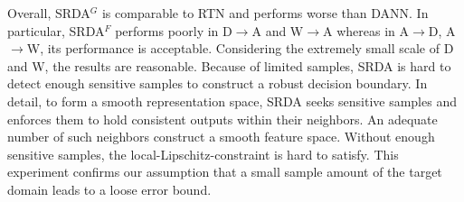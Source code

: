 \documentclass[journal,twocolumn]{IEEEtran}
\theoremstyle{definition}
\begin{document}
Overall, SRDA$^G$ is comparable to RTN and performs worse than DANN. In particular, SRDA$^F$ performs poorly in D$\rightarrow$A and W$\rightarrow$A whereas in A$\rightarrow$D, A$\rightarrow$W, its performance is acceptable. Considering the extremely small scale of D and W, the results are reasonable. Because of limited samples, SRDA is hard to detect enough sensitive samples to construct a robust decision boundary. In detail, to form a smooth representation space, SRDA seeks sensitive samples and enforces them to hold consistent outputs within their neighbors. An adequate number of such neighbors construct a smooth feature space. Without enough sensitive samples, the local-Lipschitz-constraint is hard to satisfy. This experiment confirms our assumption that a small sample amount of the target domain leads to a loose error bound.

\begin{table}[htbp]
\centering
\caption{Classification accuracy percentage of Office-31 classification experiment among all four tasks. The first row corresponds to the performance if no adaption is implemented. We evaluate two SRDA models with different methods for adding noise. The results are cited from each study.}
\label{tab:office}
\end{table}
\end{document}
